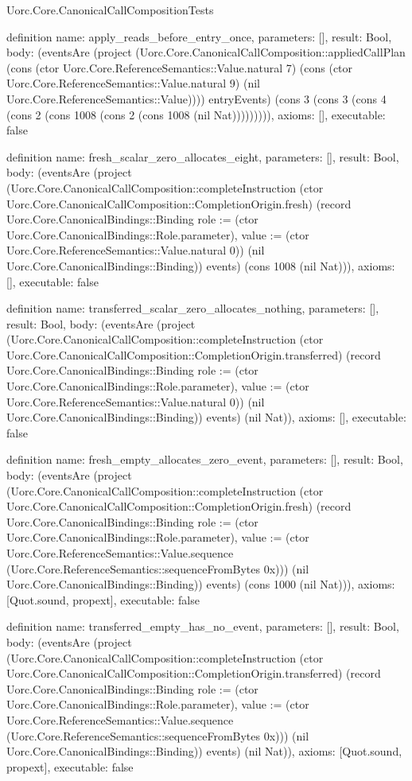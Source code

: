 \begin{lexlean}{Uorc.Core.CanonicalCallCompositionTests}
\begin{semanticmodule}
definition{
  name: apply_reads_before_entry_once,
  parameters: [],
  result: Bool,
  body: (eventsAre (project (Uorc.Core.CanonicalCallComposition::appliedCallPlan (cons (ctor Uorc.Core.ReferenceSemantics::Value.natural 7) (cons (ctor Uorc.Core.ReferenceSemantics::Value.natural 9) (nil Uorc.Core.ReferenceSemantics::Value)))) entryEvents) (cons 3 (cons 3 (cons 4 (cons 2 (cons 1008 (cons 2 (cons 1008 (nil Nat))))))))),
  axioms: [],
  executable: false
}

definition{
  name: fresh_scalar_zero_allocates_eight,
  parameters: [],
  result: Bool,
  body: (eventsAre (project (Uorc.Core.CanonicalCallComposition::completeInstruction (ctor Uorc.Core.CanonicalCallComposition::CompletionOrigin.fresh) (record Uorc.Core.CanonicalBindings::Binding {role := (ctor Uorc.Core.CanonicalBindings::Role.parameter), value := (ctor Uorc.Core.ReferenceSemantics::Value.natural 0)}) (nil Uorc.Core.CanonicalBindings::Binding)) events) (cons 1008 (nil Nat))),
  axioms: [],
  executable: false
}

definition{
  name: transferred_scalar_zero_allocates_nothing,
  parameters: [],
  result: Bool,
  body: (eventsAre (project (Uorc.Core.CanonicalCallComposition::completeInstruction (ctor Uorc.Core.CanonicalCallComposition::CompletionOrigin.transferred) (record Uorc.Core.CanonicalBindings::Binding {role := (ctor Uorc.Core.CanonicalBindings::Role.parameter), value := (ctor Uorc.Core.ReferenceSemantics::Value.natural 0)}) (nil Uorc.Core.CanonicalBindings::Binding)) events) (nil Nat)),
  axioms: [],
  executable: false
}

definition{
  name: fresh_empty_allocates_zero_event,
  parameters: [],
  result: Bool,
  body: (eventsAre (project (Uorc.Core.CanonicalCallComposition::completeInstruction (ctor Uorc.Core.CanonicalCallComposition::CompletionOrigin.fresh) (record Uorc.Core.CanonicalBindings::Binding {role := (ctor Uorc.Core.CanonicalBindings::Role.parameter), value := (ctor Uorc.Core.ReferenceSemantics::Value.sequence (Uorc.Core.ReferenceSemantics::sequenceFromBytes 0x))}) (nil Uorc.Core.CanonicalBindings::Binding)) events) (cons 1000 (nil Nat))),
  axioms: [Quot.sound, propext],
  executable: false
}

definition{
  name: transferred_empty_has_no_event,
  parameters: [],
  result: Bool,
  body: (eventsAre (project (Uorc.Core.CanonicalCallComposition::completeInstruction (ctor Uorc.Core.CanonicalCallComposition::CompletionOrigin.transferred) (record Uorc.Core.CanonicalBindings::Binding {role := (ctor Uorc.Core.CanonicalBindings::Role.parameter), value := (ctor Uorc.Core.ReferenceSemantics::Value.sequence (Uorc.Core.ReferenceSemantics::sequenceFromBytes 0x))}) (nil Uorc.Core.CanonicalBindings::Binding)) events) (nil Nat)),
  axioms: [Quot.sound, propext],
  executable: false
}


\end{semanticmodule}
\end{lexlean}
